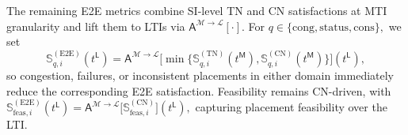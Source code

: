 \documentclass[12pt,lettersize,journal,onecolumn]{IEEEtran}
\begin{document}
The remaining E2E metrics combine SI-level TN and CN satisfactions at MTI granularity and lift them to LTIs via $\mathsf{A}^{\mathscr{M}\rightarrow\mathscr{L}}[\cdot]$. For $q\in\{\mathrm{cong},\mathrm{status},\mathrm{cons}\},$ we set
$$\mathbb{S}^{\mathrm{(E2E)}}_{q,i}(t^\mathsf{L})
=
\mathsf{A}^{\mathscr{M}\rightarrow\mathscr{L}}\bigl[\min\{\mathbb{S}^{\mathrm{(TN)}}_{q,i}(t^\mathsf{M}),
\mathbb{S}^{\mathrm{(CN)}}_{q,i}(t^\mathsf{M})\}\bigr](t^\mathsf{L}),$$ 
so congestion, failures, or inconsistent placements in either domain immediately reduce the corresponding E2E satisfaction. Feasibility remains CN-driven, with
$\mathbb{S}^{\mathrm{(E2E)}}_{\mathrm{feas},i}(t^\mathsf{L})
=
\mathsf{A}^{\mathscr{M}\rightarrow\mathscr{L}}\bigl[\mathbb{S}^{\mathrm{(CN)}}_{\mathrm{feas},i}\bigr](t^\mathsf{L}),$
capturing placement feasibility over the LTI. %
\end{document}
